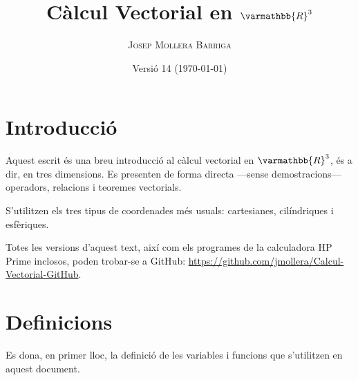 \documentclass[catalan,a4paper,twoside,11pt]{article}
\begin{document}
\title{Càlcul Vectorial en $\varmathbb{R}^3$}
\author{\textsc{Josep Mollera Barriga}}
\date{Versió 14 (\today)}
\maketitle


\section{Introducció}

Aquest escrit és una breu introducció al càlcul vectorial en $\varmathbb{R}^3$, és a dir, en tres dimensions. Es presenten de forma directa ---sense demostracions--- operadors, relacions i teoremes vectorials.

S'utilitzen els tres tipus de coordenades més usuals:  cartesianes, 
cilíndriques i esfèriques.

Totes les versions d'aquest text, així com els programes de la calculadora \textsf{HP Prime} inclosos, poden trobar-se a GitHub: \href{https://github.com/jmollera/Calcul-Vectorial-GitHub}{https://github.com/jmollera/Calcul-Vectorial-GitHub}.


\section{Definicions}

Es dona, en primer lloc, la definició de les variables i funcions que s'utilitzen en aquest document.
\end{document}
